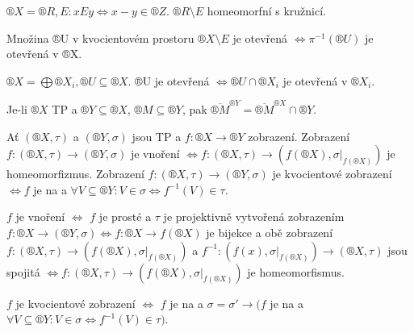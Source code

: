 \documentclass[12pt]{article}					%
\begin{document}
        \begin{priklad}
            $®X = ®R, E: xEy \Leftrightarrow x-y \in ®Z$. $®R \setminus E$ homeomorfní s kružnicí.
        \end{priklad}

        \begin{poznamka}
            Množina ®U v kvocientovém prostoru $®X \setminus E$ je otevřená $\Leftrightarrow \pi^{-1}(®U)$ je otevřená v ®X.

            $®X = \bigoplus ®X_i, ®U \subseteq ®X$. ®U je otevřená $\Leftrightarrow ®U \cap ®X_i$ je otevřená v $®X_i$.
        \end{poznamka}


        \begin{priklad}
            Je-li $®X$ TP a $®Y \subseteq ®X$, $®M \subseteq ®Y$, pak $\overline{®M}^{®Y} = \overline{®M}^{®X}\cap ®Y$.
        \end{priklad}

        \begin{tvrzeni}
            Ať $(®X, \tau)$ a $(®Y, \sigma)$ jsou TP a $f:®X \rightarrow ®Y$ zobrazení. Zobrazení $f:(®X, \tau) \rightarrow (®Y, \sigma)$ je vnoření $\Leftrightarrow f:(®X, \tau) \rightarrow (f(®X), \sigma|_{f(®X)})$ je homeomorfizmus. Zobrazení $f:(®X, \tau) \rightarrow (®Y, \sigma)$ je kvocientové zobrazení $\Leftrightarrow f$ je na a $\forall V \subseteq ®Y: V \in \sigma \Leftrightarrow f^{-1}(V) \in \tau$.

            \begin{dukazin}
                $f$ je vnoření $\Leftrightarrow$ $f$ je prosté a $\tau$ je projektivně vytvořená zobrazením $f: ®X \rightarrow (®Y, \sigma) \Leftrightarrow f: ®X \rightarrow f(®X)$ je bijekce a obě zobrazení $f: (®X, \tau) \rightarrow (f(®X), \sigma|_{f(®X)})$ a $f^{-1}: (f(x), \sigma|_{f(®X)}) \rightarrow (®X, \tau)$ jsou spojitá $\Leftrightarrow f:(®X, \tau) \rightarrow (f(®X), \sigma|_{f(®X)})$ je homeomorfismus.

                $f$ je kvocientové zobrazení $\Leftrightarrow$ $f$ je na a $\sigma = \sigma' \rightarrow (f$ je na a $\forall V \subseteq ®Y: V \in \sigma \Leftrightarrow f^{-1}(V)\in \tau)$.
            \end{dukazin}
        \end{tvrzeni}
\end{document}
